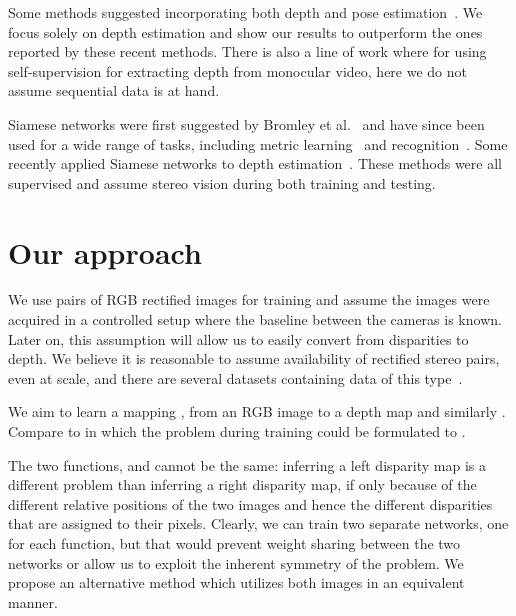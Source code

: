 \documentclass[10pt,twocolumn,letterpaper]{article}
\newcommand{\minisection}[1]{\vspace{1mm}\noindent{\textbf{#1}}}
\begin{document}
Some methods suggested incorporating both depth and pose estimation~\cite{geonet,zhou2017unsupervised}. We focus solely on depth estimation and show our results to outperform the ones reported by these recent methods.
There is also a line of work \cite{kumar2018depthnet, mahjourian2018unsupervised,yang2018deep} where for using self-supervision for extracting depth from monocular video, here we do not assume sequential data is at hand.

\minisection{Siamese networks.} Siamese networks were first suggested by Bromley et al.~\cite{bromley1994signature} and have since been used for a wide range of tasks, including metric learning~\cite{chopra2005learning} and recognition~\cite{koch2015siamese}. Some recently applied Siamese networks to depth estimation~\cite{kendall2017end,luo2016efficient}. These methods were all supervised and assume stereo vision during both training and testing.


\section{Our approach}
We use pairs of RGB rectified images for training and assume the images were acquired in a controlled setup where the baseline between the cameras is known. Later on, this assumption will allow us to easily convert from disparities to depth. We believe it is reasonable to assume availability of rectified stereo pairs, even at scale, and there are several datasets containing data of this type~\cite{Cordts2016TheUnderstanding,geiger2013vision,Menze2015ObjectVehiclesb}.

We aim to learn a mapping , from an RGB image to a depth map and similarly . Compare to \cite{monodepth17} in which the problem during training could be formulated to .

The two functions,  and  cannot be the same: inferring a left disparity map is a different problem than inferring a right disparity map, if only because of the different relative positions of the two images and hence the different disparities that are assigned to their pixels. Clearly, we can train two separate networks, one for each function, but that would prevent weight sharing between the two networks or allow us to exploit the inherent symmetry of the problem. We propose an alternative method which utilizes both images in an equivalent manner.
\end{document}
